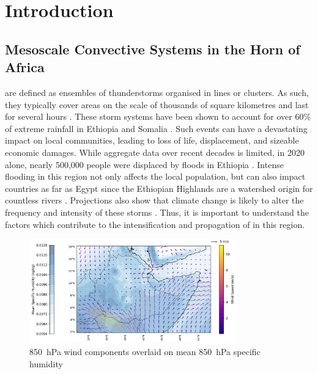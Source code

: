 \chapter{Introduction}
\label{ch:intro}

\section{Mesoscale Convective Systems in the Horn of Africa}

 are defined as ensembles of thunderstorms organised in lines or clusters. As such, they typically cover areas on the scale of thousands of square kilometres and last for several hours \citep{Houze2004}. These storm systems have been shown to account for over 60\% of extreme rainfall in Ethiopia and Somalia \citep{Hill2023}. Such events can have a devastating impact on local communities, leading to loss of life, displacement, and sizeable economic damages. While aggregate data over recent decades is limited, in 2020 alone, nearly 500,000 people were displaced by floods in Ethiopia \citep{Mekuria2022}. Intense flooding in this region not only affects the local population, but can also impact countries as far as Egypt since the Ethiopian Highlands are a watershed origin for countless rivers \citep{Mamo2019,Legese2020,Zaroug2014}. Projections also show that climate change is likely to alter the frequency and intensity of these storms \citep{Endris2019,Das2016,Li2023}. Thus, it is important to understand the factors which contribute to the intensification and propagation of  in this region.

\begin{figure}[ht]
    \centering
    \includegraphics[width=0.8\textwidth]{../figures/generated/exploration/mean_humidity_wind.png}
    \caption{\SI{850}{\hecto\pascal} wind components overlaid on mean \SI{850}{\hecto\pascal} specific humidity}
    \label{fig:mean_humidity_wind}
\end{figure}

